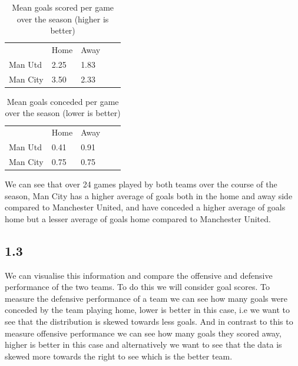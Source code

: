 \documentclass[12pt]{report}
\begin{document}
\begin{table}[ht]
\centering
\caption{Mean goals scored per game over the season (higher is better)}
\begin{tabular}{lllll}
         & Home & Away &  &  \\
Man Utd  & 2.25 & 1.83 &  &  \\
Man City & 3.50 & 2.33 &  &  \\
\end{tabular}
\end{table}

\begin{table}[ht]
\centering
\caption{Mean goals conceded per game over the season (lower is better)}
\begin{tabular}{lllll}
         & Home & Away &  &  \\
Man Utd  & 0.41 & 0.91 &  &  \\
Man City & 0.75 & 0.75 &  &  \\
\end{tabular}
\end{table}

\noindent
We can see that over 24 games played by both teams over the course of the season, Man City has a higher average of goals both in the home and away side compared to Manchester United, and have conceded a higher average of goals home but a lesser average of goals home compared to Manchester United. 

\newpage

\subsection{1.3}
\vspace{0.3cm}
We can visualise this information and compare the offensive and defensive performance of the two teams. To do this we will consider goal scores. To measure the defensive performance of a team we can see how many goals were conceded by the team playing home, lower is better in this case, i.e we want to see that the distribution is skewed towards less goals. And in contrast to this to measure offensive performance we can see how many goals they scored away, higher is better in this case and alternatively we want to see that the data is skewed more towards the right to see which is the better team. 
\end{document}
